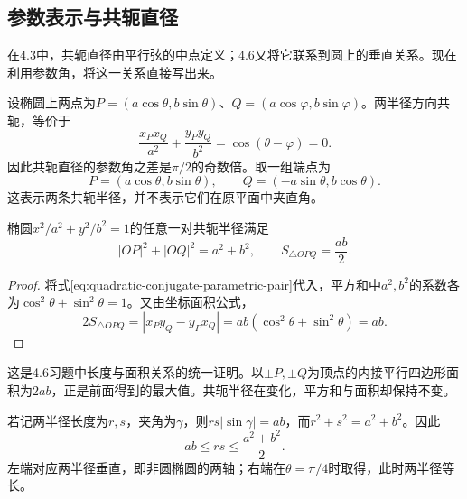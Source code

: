 \subsection{参数表示与共轭直径}
\label{subsec:quadratic-conjugate-diameters}

在4.3中，共轭直径由平行弦的中点定义；4.6又将它联系到圆上的垂直关系。现在利用参数角，将这一关系直接写出来。

设椭圆上两点为\(P=(a\cos\theta,b\sin\theta)\)、\(Q=(a\cos\varphi,b\sin\varphi)\)。两半径方向共轭，等价于
\begin{equation*}
    \frac{x_Px_Q}{a^2}+\frac{y_Py_Q}{b^2}
    =\cos(\theta-\varphi)=0 .
\end{equation*}
因此共轭直径的参数角之差是\(\pi/2\)的奇数倍。取一组端点为
\begin{equation}\label{eq:quadratic-conjugate-parametric-pair}
    P=(a\cos\theta,b\sin\theta),\qquad
    Q=(-a\sin\theta,b\cos\theta) .
\end{equation}
这表示两条共轭半径，并不表示它们在原平面中夹直角。

\begin{proposition}\label{prop:quadratic-conjugate-radius-invariants}
椭圆\(x^2/a^2+y^2/b^2=1\)的任意一对共轭半径满足
\begin{equation}\label{eq:quadratic-conjugate-sum-area}
    |OP|^2+|OQ|^2=a^2+b^2,\qquad
    S_{\triangle OPQ}=\frac{ab}{2} .
\end{equation}
\end{proposition}

\begin{proof}
将式\eqref{eq:quadratic-conjugate-parametric-pair}代入，平方和中\(a^2,b^2\)的系数各为\(\cos^2\theta+\sin^2\theta=1\)。又由坐标面积公式，
\begin{equation*}
    2S_{\triangle OPQ}=|x_Py_Q-y_Px_Q|
        =ab(\cos^2\theta+\sin^2\theta)=ab .
\end{equation*}
\end{proof}

这是4.6习题中长度与面积关系的统一证明。以\(\pm P,\pm Q\)为顶点的内接平行四边形面积为\(2ab\)，正是前面得到的最大值。共轭半径在变化，平方和与面积却保持不变。

若记两半径长度为\(r,s\)，夹角为\(\gamma\)，则\(rs|\sin\gamma|=ab\)，而\(r^2+s^2=a^2+b^2\)。因此
\begin{equation}\label{eq:quadratic-conjugate-product-range}
    ab\le rs\le\frac{a^2+b^2}{2} .
\end{equation}
左端对应两半径垂直，即非圆椭圆的两轴；右端在\(\theta=\pi/4\)时取得，此时两半径等长。


